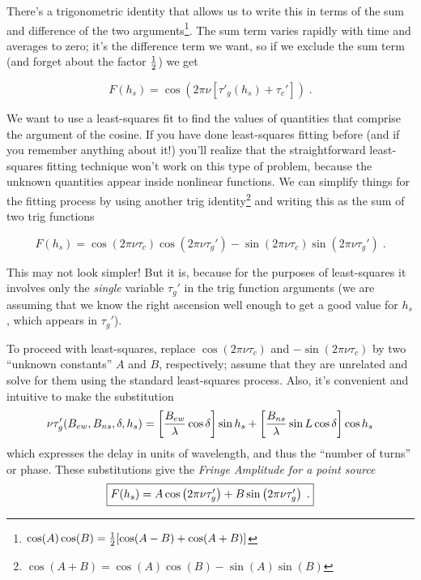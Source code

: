 \documentclass[11pt,preprint]{aastex}
\begin{document}
\noindent There's a trigonometric identity that allows us to write this
in terms of the sum and difference of the two
arguments\footnote{$\cos(A) \cos(B)= {1 \over 2}[\cos(A-B) +
\cos(A+B)]$}. The sum term varies rapidly with time and averages to zero;
it's the difference term we want, so if we exclude the sum term (and
forget about the factor $1 \over 2$) we get

\begin{equation}
 F(h_s) = \cos (2 \pi \nu [\tau'_{g}(h_s) + \tau_c']) \; . 
\end{equation}


	We want to use a least-squares fit to find the values of
quantities that comprise the argument of the cosine.  If you have done
least-squares fitting before (and if you remember anything about it!)
you'll realize that the straightforward least-squares fitting technique
won't work on this type of problem, because the unknown quantities
appear inside nonlinear functions.  We can simplify things for the
fitting process by using another trig identity\footnote{$\cos(A+B) =
\cos(A)\cos(B) - \sin(A)\sin(B)$} and writing this as the
sum of two trig functions

\begin{equation}
 F(h_s) = \cos(2 \pi \nu \tau_c) \cos \left(2 \pi \nu \tau_g' \right) - 
          \sin(2 \pi \nu \tau_c) \sin \left(2 \pi \nu \tau_g' \right) \; .  
\end{equation}

\noindent This may not look simpler! But it is, because for the purposes
of least-squares it involves only the {\it single} variable $\tau_g'$ in
the trig function arguments (we are assuming that we know the right
ascension well enough to get a good value for $h_s$, which appears in
$\tau_g'$).

	To proceed with least-squares, replace $\cos (2 \pi \nu \tau_c)$
and $-\sin (2 \pi \nu \tau_c)$ by two ``unknown constants'' $A$ and $B$,
respectively; assume that they are unrelated and solve for them using
the standard least-squares process. Also, it's convenient and intuitive
to make the substitution 
%
\begin{equation} \label{nutau}
\nu \tau_g'(B_{ew}, B_{ns}, \delta, h_s) = \left[{B_{ew} \over \lambda} \cos \delta \right] \sin h_s 
  + \left[{B_{ns} \over \lambda} \sin L \cos \delta \right] \cos h_s
\end{equation}
%
\noindent which expresses the delay in units of wavelength, and thus the
``number of turns'' or phase. These substitutions give the {\it Fringe
  Amplitude for a point source}
%
\begin{equation} \label{maineqn} \fbox{$
\label{fringeresponse}
 F(h_s) = A \cos \left(2 \pi \nu \tau_g' \right) 
         +B \sin \left(2 \pi \nu \tau_g' \right) \; . 
$}
\end{equation}
\end{document}

